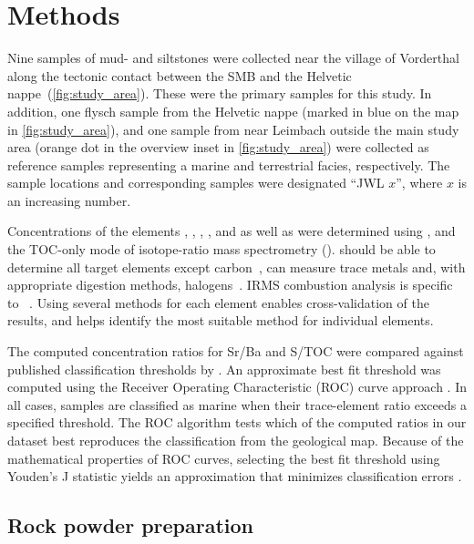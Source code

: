 \chapter{Methods}

Nine samples of mud- and siltstones were collected near the village
of Vorderthal along the tectonic contact between the SMB and the Helvetic 
nappe~(\cref{fig:study_area}). 
These were the primary samples for this study. In addition, one flysch sample from the Helvetic nappe
(marked in blue on the map in \cref{fig:study_area}), and one \OSM sample
from near Leimbach outside the main study area (orange dot in the
overview inset in \cref{fig:study_area}) were collected
as reference samples representing a marine and terrestrial
facies, respectively. The sample locations and corresponding samples
were designated ``JWL $x$'', where $x$ is an increasing number.

Concentrations of the elements , , , 
, and  as well as \TOC were determined using \XRF, \ICPMS
and the TOC-only mode of isotope-ratio mass spectrometry ().
\XRF should be able to determine all target elements except carbon~\parencite{ichikawa_solid_2023}, \ICPMS
can measure trace metals and, with appropriate digestion methods, halogens~\parencite{he_rapid_2018}. 
IRMS combustion analysis is specific to \TOC~\parencite{irms}.
Using several methods for each element enables cross-validation 
of the results, and helps identify the most suitable method for individual elements.

The computed concentration ratios for Sr/Ba and S/TOC were compared against published classification thresholds
by \textcite{berner-raiswell-1983,wei-2020}. An approximate best fit threshold was computed
using the Receiver Operating Characteristic (ROC) curve approach \parencite{fawcett-roc-2006}.
In all cases, samples are classified as marine when their trace-element ratio exceeds a specified threshold.
The ROC algorithm tests which of the computed ratios in our dataset best reproduces the classification 
from the geological map.
Because of the mathematical properties of ROC curves, selecting the best fit threshold
using Youden's J statistic yields an approximation that minimizes classification errors \parencite{youden-index-2019}.

\section{Rock powder preparation}

